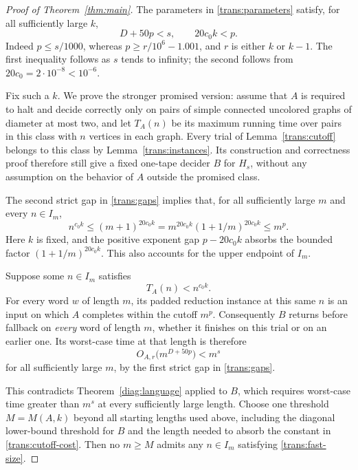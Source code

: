 \begin{proof}[Proof of Theorem~\ref{thm:main}]
The parameters in \eqref{trans:parameters} satisfy, for all sufficiently
large $k$,
\begin{equation}
\label{trans:gaps}
  D+50p<s,
  \qquad
  20c_0 k<p.
\end{equation}
Indeed $p\le s/1000$, whereas
$p\ge r/10^6-1.001$, and $r$ is either $k$ or $k-1$. The first inequality
follows as $s$ tends to infinity; the second follows from
$20c_0=2\cdot10^{-8}<10^{-6}$.

Fix such a $k$. We prove the stronger promised version: assume that $A$
is required to halt and decide correctly only on pairs of simple connected
uncolored graphs of diameter at most two, and let $T_A(n)$ be its maximum
running time over pairs in this class with $n$ vertices in each graph.
Every trial of Lemma~\ref{trans:cutoff} belongs to this class by
Lemma~\ref{trans:instances}. Its construction and correctness proof
therefore still give a fixed one-tape decider $B$ for $H_s$, without any
assumption on the behavior of $A$ outside the promised class.

The second strict gap in \eqref{trans:gaps} implies that, for all
sufficiently large $m$ and every $n\in I_m$,
\begin{equation}
\label{trans:upper-endpoint}
  n^{c_0 k}
  \le (m+1)^{20c_0 k}
  =m^{20c_0 k}(1+1/m)^{20c_0 k}
  \le m^p.
\end{equation}
Here $k$ is fixed, and the positive exponent gap
$p-20c_0k$ absorbs the bounded factor $(1+1/m)^{20c_0k}$. This also accounts
for the upper endpoint of $I_m$.

Suppose some $n\in I_m$ satisfies
\begin{equation}
\label{trans:fast-size}
  T_A(n)<n^{c_0 k}.
\end{equation}
For every word $w$ of length $m$, its padded reduction instance at this
same $n$ is an input on which $A$ completes within the cutoff $m^p$.
Consequently $B$ returns before fallback on \emph{every} word of length
$m$, whether it finishes on this trial or on an earlier one. Its worst-case
time at that length is therefore
\[
  O_{A,r}\bigl(m^{D+50p}\bigr)<m^s
\]
for all sufficiently large $m$, by the first strict gap in
\eqref{trans:gaps}.

This contradicts Theorem~\ref{diag:language} applied to $B$, which requires
worst-case time greater than $m^s$ at every sufficiently large length.
Choose one threshold $M=M(A,k)$ beyond all starting lengths used above,
including the diagonal lower-bound threshold for $B$ and the length needed
to absorb the constant in \eqref{trans:cutoff-cost}. Then no
$m\ge M$ admits any $n\in I_m$ satisfying \eqref{trans:fast-size}.


\end{proof}

